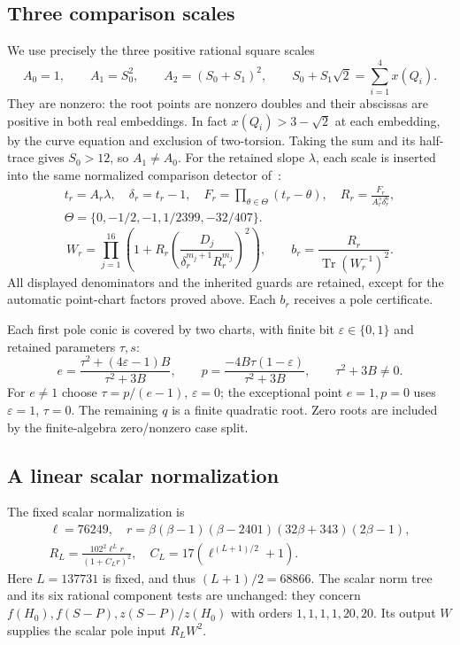 \documentclass[11pt,a4paper]{article}
\DeclareMathOperator{\Tr}{Tr}
\begin{document}
\subsection{Three comparison scales}

We use precisely the three positive rational
square scales
\begin{equation}\label{eq:scales}
 A_0=1,\qquad
 A_1=S_0^2,\qquad A_2=(S_0+S_1)^2,
 \qquad S_0+S_1\sqrt2=\sum_{i=1}^4x(Q_i).
\end{equation}
They are nonzero: the root points are nonzero doubles and
their abscissas are positive in both real embeddings.
In fact $x(Q_i)>3-\sqrt2$ at each embedding, by the curve
equation and exclusion of two-torsion. Taking the sum and its
half-trace gives $S_0>12$, so $A_1\ne A_0$.
For the retained slope $\lambda$, each scale is inserted into
the same normalized comparison detector of~\cite{Baseline}:
\[
 \begin{gathered}
 t_r=A_r\lambda,\quad \delta_r=t_r-1,\quad
 F_r=\prod_{\theta\in\Theta}(t_r-\theta),\quad
 R_r=\frac{F_r}{A_r^5\delta_r^6},\\
 \Theta=\{0,-1/2,-1,1/2399,-32/407\}.
 \end{gathered}
\]
\[
 W_r=\prod_{j=1}^{16}\left(
 1+R_r\left(\frac{D_j}{\delta_r^{m_j+1}R_r^{m_j}}\right)^2\right),
 \qquad b_r=\frac{R_r}{\Tr(W_r^{-1})^2}.
\]
All displayed denominators and the inherited guards are retained,
except for the automatic point-chart factors proved above.
Each $b_r$ receives a pole certificate.

Each first pole conic is covered by two charts, with finite bit
$\varepsilon\in\{0,1\}$ and retained parameters $\tau,s$:
\[
 e=\frac{\tau^2+(4\varepsilon-1)B}{\tau^2+3B},\qquad
 p=\frac{-4B\tau(1-\varepsilon)}{\tau^2+3B},\qquad
 \tau^2+3B\ne0.
\]
For $e\ne1$ choose $\tau=p/(e-1)$, $\varepsilon=0$;
the exceptional point $e=1,p=0$ uses $\varepsilon=1$, $\tau=0$.
The remaining $q$ is a finite quadratic root. Zero roots are
included by the finite-algebra zero/nonzero case split.

\subsection{A linear scalar normalization}

The fixed scalar normalization is
\begin{equation}\label{eq:normalizer}
 \begin{gathered}
 \ell=76249,\quad
 r=\beta(\beta-1)(\beta-2401)(32\beta+343)(2\beta-1),\\
 R_L=\frac{102^2\ell^L r}{(1+C_Lr)^2},\quad
 C_L=17(\ell^{(L+1)/2}+1).
 \end{gathered}
\end{equation}
Here $L=137731$ is fixed, and thus $(L+1)/2=68866$. The scalar norm tree and its six rational
component tests are unchanged: they concern
$f(H_0),f(S-P),z(S-P)/z(H_0)$ with orders
$1,1,1,1,20,20$. Its output $W$ supplies the scalar pole
input $R_LW^2$.
\end{document}
